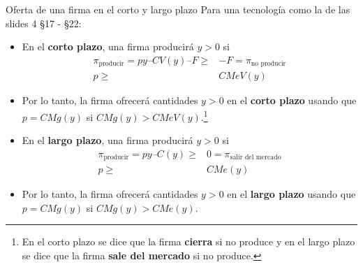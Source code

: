 \documentclass{beamer}
\theoremstyle{definition}
\begin{document}
\begin{frame}{Oferta de una firma en el corto y largo plazo}
Para una tecnología como la de las slides 4 \S17 - \S22:
\begin{itemize}
\item En el \color{cyan} \textbf{corto plazo}\color{black}, una firma producirá $y>0$ si \begin{align*}
\pi_{\text{producir}}=py – CV(y) – F\geq& -F=\pi_{\text{no producir}}\\ p \geq & CMeV(y)\end{align*}

\item Por lo tanto, la firma ofrecerá cantidades $y>0$ en el \color{cyan} \textbf{corto plazo} \color{black} usando que $p=CMg(y)$ si $CMg(y)>CMeV(y)$.\footnote{En el corto plazo se dice que la firma \textbf{cierra} si no produce y en el largo plazo se dice que la firma \textbf{sale del mercado} si no produce.} 

\item En el \color{rosee} \textbf{largo plazo}\color{black}, una firma producirá $y>0$ si \begin{align*}\pi_{\text{producir}}=py – C(y)\geq& 0=\pi_{\text{salir del mercado}}\\  p \geq & CMe(y)\end{align*}

\item Por lo tanto, la firma ofrecerá cantidades $y>0$ en el \color{rosee} \textbf{largo plazo} \color{black} usando que $p=CMg(y)$ si $CMg(y)>CMe(y)$. 

\end{itemize}
\end{frame}
\end{document}
